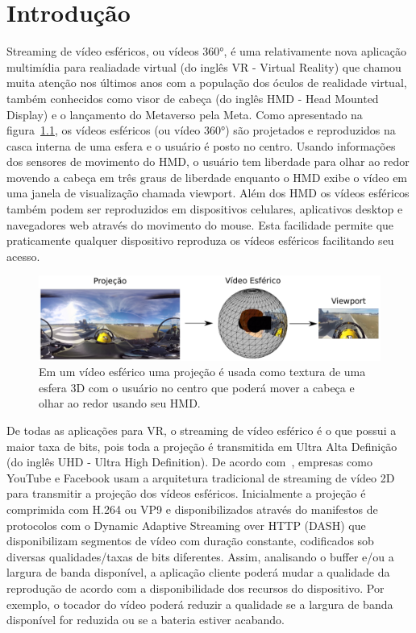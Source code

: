 \chapter{Introdução}\label{Cap:Introduction}


Streaming de vídeo esféricos, ou vídeos 360°, é uma relativamente nova aplicação multimídia para realiadade virtual (do inglês VR - Virtual Reality) que chamou muita atenção nos últimos anos com a população dos óculos de realidade virtual, também conhecidos como visor de cabeça (do inglês HMD - Head Mounted Display) e o lançamento do Metaverso pela Meta. Como apresentado na figura~\ref{fig:video360}, os vídeos esféricos (ou vídeo 360°) são projetados e reproduzidos na casca interna de uma esfera e o usuário é posto no centro. Usando informações dos sensores de movimento do HMD, o usuário tem liberdade para olhar ao redor movendo a cabeça em três graus de liberdade enquanto o HMD exibe o vídeo em uma janela de visualização chamada viewport. Além dos HMD os vídeos esféricos também podem ser reproduzidos em dispositivos celulares, aplicativos desktop e navegadores web através do movimento do mouse. Esta facilidade permite que praticamente qualquer dispositivo reproduza os vídeos esféricos facilitando seu acesso.

\begin{figure}[h]
	\centering
	\includegraphics[width=0.8\columnwidth]{fig/viewport.pdf}
	\caption{Em um vídeo esférico uma projeção é usada como textura de uma esfera 3D com o usuário no centro que poderá mover a cabeça e olhar ao redor usando seu HMD.}
	\label{fig:video360}
\end{figure}

De todas as aplicações para VR, o streaming de vídeo esférico é o que possui a maior taxa de bits, pois toda a projeção é transmitida em Ultra Alta Definição (do inglês UHD - Ultra High Definition). De acordo com~\cite{Zhou2017, Liu2017}, empresas como YouTube e Facebook usam a arquitetura tradicional de streaming de vídeo 2D para transmitir a projeção dos vídeos esféricos. Inicialmente a projeção é comprimida com H.264 ou VP9 e disponibilizados através do manifestos de protocolos com o Dynamic Adaptive Streaming over HTTP (DASH) que disponibilizam segmentos de vídeo com duração constante, codificados sob diversas qualidades/taxas de bits diferentes. Assim, analisando o buffer e/ou a largura de banda disponível, a aplicação cliente poderá mudar a qualidade da reprodução de acordo com a disponibilidade dos recursos do dispositivo. Por exemplo, o tocador do vídeo poderá reduzir a qualidade se a largura de banda disponível for reduzida ou se a bateria estiver acabando.

